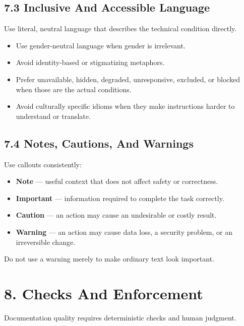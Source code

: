 \subsection{7.3 Inclusive And Accessible Language}\label{record-005-inclusive-and-accessible-language}

Use literal, neutral language that describes the technical condition directly.

\begin{itemize}
\tightlist
\item
  Use gender-neutral language when gender is irrelevant.
\item
  Avoid identity-based or stigmatizing metaphors.
\item
  Prefer unavailable, hidden, degraded, unresponsive, excluded, or blocked when those are the actual conditions.
\item
  Avoid culturally specific idioms when they make instructions harder to understand or translate.
\end{itemize}

\subsection{7.4 Notes, Cautions, And Warnings}\label{record-005-notes-cautions-and-warnings}

Use callouts consistently:

\begin{itemize}
\tightlist
\item
  \textbf{Note} --- useful context that does not affect safety or correctness.
\item
  \textbf{Important} --- information required to complete the task correctly.
\item
  \textbf{Caution} --- an action may cause an undesirable or costly result.
\item
  \textbf{Warning} --- an action may cause data loss, a security problem, or an irreversible change.
\end{itemize}

Do not use a warning merely to make ordinary text look important.

\section{8. Checks And Enforcement}\label{record-005-checks-and-enforcement}

Documentation quality requires deterministic checks and human judgment.

